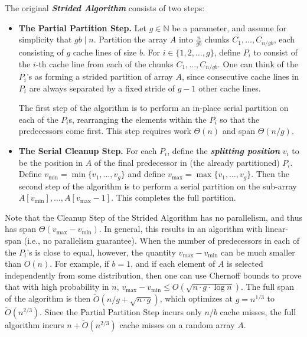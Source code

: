 \documentclass[11pt]{article}
\newcommand{\defn}[1]{{\textit{\textbf{\boldmath #1}}} }
\theoremstyle{remark}
\theoremstyle{remark}
\begin{document}
The original \defn{Strided Algorithm} consists of two steps: 
\begin{itemize}
\item \textbf{The Partial Partition Step.} Let $g \in \mathbb{N}$ be a
  parameter, and assume for simplicity that $gb \mid n$. Partition the
  array $A$ into $\frac{n}{gb}$ chunks $C_1, \ldots, C_{n / gb}$,
  each consisting of $g$ cache lines of size $b$.
	For $i \in \{1, 2, \ldots, g\}$, define 
  $P_i$ to consist of the $i$-th cache line from each of the
  chunks $C_1, \ldots, C_{n / gb}$. One can think of the $P_i$'s
	as forming a strided partition of array $A$, since
  consecutive cache lines in $P_i$ are always separated by a fixed
  stride of $g - 1$ other cache lines.

  The first step of the algorithm is to perform an in-place serial
  partition on each of the $P_i$s, rearranging the elements within the
  $P_i$ so that the predecessors come first. This step requires work
  $\Theta(n)$ and span $\Theta(n/g)$.
\item \textbf{The Serial Cleanup Step. }For each $P_i$, define the \defn{splitting position} $v_i$ to be
  the position in $A$ of the final predecessor in (the already
  partitioned) $P_i$. Define $v_{\text{min}} = \min\{v_1, \ldots,
  v_{g}\}$ and define $v_{\text{max}} = \max\{v_1, \ldots, v_{g}\}$. Then the
  second step of the algorithm is to perform a serial partition on the
	sub-array \\$A[v_{\text{min}}],\ldots, A[v_{\text{max}}-1]$. This completes the   
    full partition.
\end{itemize}

Note that the Cleanup Step of the Strided Algorithm has no
parallelism, and thus has span $\Theta(v_{\text{max}} -
v_{\text{min}})$.  In general, this results in an algorithm with
linear-span (i.e., no parallelism guarantee).  When the number of
predecessors in each of the $P_i$'s is close to equal, however, the
quantity $v_{\text{max}} - v_{\text{min}}$ can be much smaller than
$O(n)$.  For example, if $b = 1$, and if each element of $A$ is
selected independently from some distribution, then one can use
Chernoff bounds to prove that with high probability in $n$,
$v_{\text{max}} - v_{\text{min}} \le O(\sqrt{n \cdot g \cdot \log
  n})$.  The full span of the algorithm is then $\tilde{O}(n/g +
\sqrt{n \cdot g})$, which optimizes at $g = n^{1/3}$ to
$\tilde{O}(n^{2/3})$. Since the Partial Partition Step incurs only $n
/ b$ cache misses, the full algorithm incurs $n + \tilde{O}(n^{2/3})$ cache
misses on a random array $A$.
\end{document}
